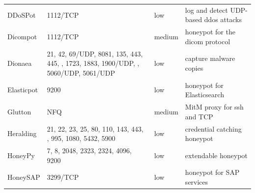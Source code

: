 \begin{table}
\begin{tabularx}{\linewidth}{l|XlX}
        DDoSPot \cite{ddosspot2021}               & 1112/TCP                                                                                                    & low                        & log and detect UDP-based \ac{ddos} attacks                                           \\
        Dicompot \cite{dicompot2021}              & 1112/TCP                                                                                                    & medium                     & honeypot for the \ac{dicom} protocol                                                 \\
        Dionaea \cite{dionaea2021}                & 21, 42, 69/UDP, 8081, 135, 443, 445, \newline 1433, 1723, 1883, 1900/UDP, \newline 3306, 5060/UDP, 5061/UDP & low                        & capture malware copies                                                               \\
        Elasticpot \cite{elasticpot2021}          & 9200                                                                                                        & low                        & honeypot for Elasticsearch                                                           \\
        Glutton \cite{glutton2021}                & NFQ                                                                                                         & medium                     & MitM proxy for \ac{ssh} and TCP                                                           \\
        Heralding \cite{heralding2021}            & 21, 22, 23, 25, 80, 110, 143, 443, \newline 993, 995, 1080, 5432, 5900                                      & low                        & credential catching honeypot                                                         \\
        HoneyPy \cite{honeysap2021}               & 7, 8, 2048, 2323, 2324, 4096, 9200                                                                          & low                        & extendable honeypot                                                                  \\
        HoneySAP \cite{honeysap2021}              & 3299/TCP                                                                                                    & low                        & honeypot for SAP services                                                            \\

\end{tabularx}
\end{table}

